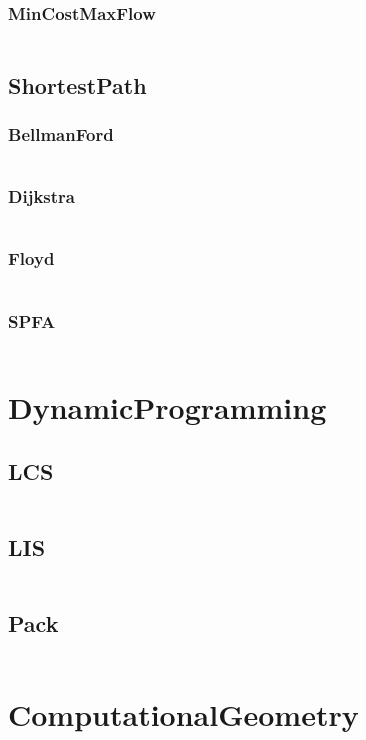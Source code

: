 \documentclass[a4paper,11pt]{article}
\begin{document}
\subsubsection{MinCostMaxFlow}
\inputminted[breaklines]{c++}{04++GraphTheory/+NetworkFlow/+MinCostMaxFlow.cpp}

\subsection{ShortestPath}
\subsubsection{BellmanFord}
\inputminted[breaklines]{c++}{04++GraphTheory/+ShortestPath/+BellmanFord.cpp}
\subsubsection{Dijkstra}
\inputminted[breaklines]{c++}{04++GraphTheory/+ShortestPath/+Dijkstra.cpp}
\subsubsection{Floyd}
\inputminted[breaklines]{c++}{04++GraphTheory/+ShortestPath/+Floyd.cpp}
\subsubsection{SPFA}
\inputminted[breaklines]{c++}{04++GraphTheory/+ShortestPath/+SPFA.cpp}


\newpage
\section{DynamicProgramming}
\subsection{LCS}
\inputminted[breaklines]{c++}{05++DynamicProgramming/+LCS.cpp}
\subsection{LIS}
\inputminted[breaklines]{c++}{05++DynamicProgramming/+LIS.cpp}
\subsection{Pack}
\inputminted[breaklines]{c++}{05++DynamicProgramming/+Pack.cpp}

\newpage
\section{ComputationalGeometry}
\end{document}
